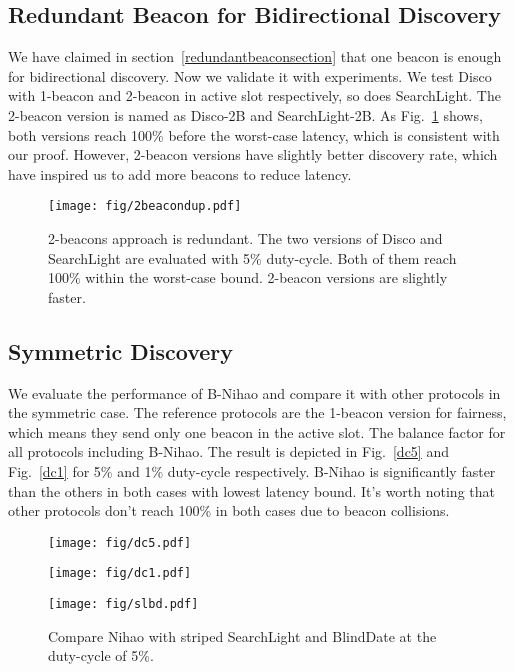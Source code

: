 \documentclass[conference]{IEEEtran}
\begin{document}
\subsection{Redundant Beacon for Bidirectional Discovery}\label{redundantbeaconexpsection}
We have claimed in section~\ref{redundantbeaconsection} that one beacon is enough for bidirectional discovery.
Now we validate it with experiments. 
We test Disco with 1-beacon and 2-beacon in active slot respectively, so does SearchLight.
The 2-beacon version is named as Disco-2B and SearchLight-2B.
As Fig.~\ref{2beacondup} shows, both versions reach 100\% before the worst-case latency, which is consistent with our proof.
However, 2-beacon versions have slightly better discovery rate, which have inspired us to add more beacons to reduce latency.

\begin{figure}[t]
    \centering
    \texttt{[image: fig/2beacondup.pdf]}
    \caption{2-beacons approach is redundant. The two versions of Disco and SearchLight are evaluated with 5\% duty-cycle.
             Both of them reach 100\% within the worst-case bound.
             2-beacon versions are slightly faster.}\label{2beacondup}
\end{figure}

\subsection{Symmetric Discovery}
We evaluate the performance of B-Nihao and compare it with other protocols in the symmetric case.
The reference protocols are the 1-beacon version for fairness, which means they send only one beacon in the active slot.
The balance factor  for all protocols including B-Nihao. 
The result is depicted in Fig.~\ref{dc5} and Fig.~\ref{dc1} for 5\% and 1\% duty-cycle respectively.
B-Nihao is significantly faster than the others in both cases with lowest latency bound.
It's worth noting that other protocols don't reach 100\% in both cases due to beacon collisions.

\begin{figure*}[t]
    \centering
    \begin{minipage}[t]{0.3\textwidth}
    \centering
    \texttt{[image: fig/dc5.pdf]}
    \caption{CDFs of discovery latency with duty-cycle 5\%.}\label{dc5}
    \end{minipage}
    \hspace{1em}
    \begin{minipage}[t]{0.3\textwidth}
    \centering
    \texttt{[image: fig/dc1.pdf]}
    \caption{CDFs of discovery latency with duty-cycle 1\%.}\label{dc1}
    \end{minipage}
    \hspace{1em}
    \begin{minipage}[t]{0.3\textwidth}
    \centering
    \texttt{[image: fig/slbd.pdf]}
    \caption{Compare Nihao with striped SearchLight and BlindDate at the duty-cycle of 5\%.}\label{slbd}
    \end{minipage}
\end{figure*}
\end{document}

